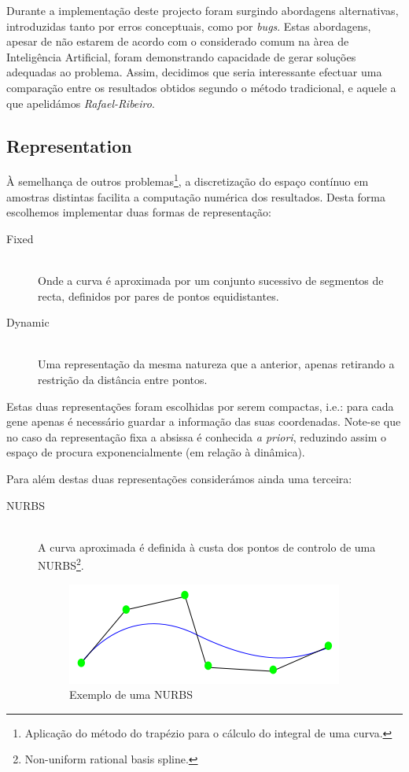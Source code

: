 \documentclass[a4paper]{article}
\begin{document}
\indent \indent Durante a implementação deste projecto foram surgindo abordagens alternativas,
introduzidas tanto por erros conceptuais, como por \emph{bugs}. Estas abordagens, apesar de não estarem de acordo com
o considerado comum na àrea de Inteligência Artificial, foram demonstrando capacidade de gerar soluções adequadas ao problema.
Assim, decidimos que seria interessante efectuar uma comparação entre os resultados obtidos segundo o método tradicional, e aquele a que apelidámos \emph{Rafael-Ribeiro}. 

\cleardoublepage
\subsection{Representation}
\label{subsec:representation}
\indent \indent À semelhança de outros problemas\footnote[1]{Aplicação do método do trapézio para o cálculo do integral de uma curva.}, a discretização do espaço contínuo em amostras
distintas facilita a computação numérica dos resultados. Desta forma escolhemos implementar duas formas de representação:

\begin{description}
	\item[Fixed] \hfill \\
	\label{it:fixed_representation}
		Onde a curva é aproximada por um conjunto sucessivo de segmentos de recta, definidos por pares de pontos equidistantes.
	\item[Dynamic] \hfill \\
	\label{it:dynamic_representation}
		Uma representação da mesma natureza que a anterior, apenas retirando a restrição da distância entre pontos.
\end{description}

\indent Estas duas representações foram escolhidas por serem compactas, i.e.: para cada gene apenas é necessário guardar a informação das suas coordenadas.
Note-se que no caso da representação fixa a absissa é conhecida \emph{a priori}, reduzindo assim o espaço de procura exponencialmente (em relação à dinâmica).

\indent Para além destas duas representações considerámos ainda uma terceira:

\begin{description}
	\item[NURBS] \hfill \\ 
		A curva aproximada é definida à custa dos pontos de controlo de uma NURBS\footnote[2]{Non-uniform rational basis spline.}. 
		\begin{figure}[ht]
			\centering
			\includegraphics[scale=0.50]{images/NURBstatic.png}
			\caption{Exemplo de uma NURBS}
			\label{fig:nurbs}
		\end{figure}
\end{description}
\end{document}
